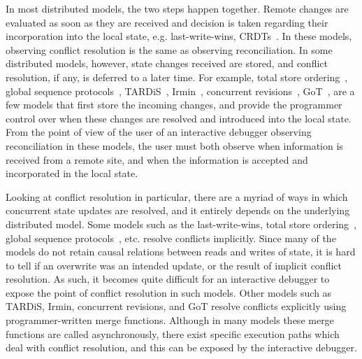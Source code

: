 In most distributed models, the two steps happen together. Remote changes are evaluated as soon as they are received and decision is taken regarding their incorporation into the local state, e.g. last-write-wins, CRDTs~\cite{shapiro11}. In these models, observing conflict resolution is the same as observing reconciliation. In some distributed models, however, state changes received are stored, and conflict resolution, if any, is deferred to a later time. For example, total store ordering~\cite{tso}, global sequence protocols~\cite{gsp, gsp1}, TARDiS~\cite{tardis}, Irmin~\cite{mergeable_types}, concurrent revisions~\cite{semantics-of-concurrent-revisions-2}, GoT~\cite{got}, are a few models that first store the incoming changes, and provide the programmer control over when these changes are resolved and introduced into the local state. From the point of view of the user of an interactive debugger observing reconciliation in these models, the user must both observe when information is received from a remote site, and when the information is accepted and incorporated in the local state.

Looking at conflict resolution in particular, there are a myriad of ways in which concurrent state updates are resolved, and it entirely depends on the underlying distributed model. Some models such as the last-write-wins, total store ordering~\cite{tso}, global sequence protocols~\cite{gsp, gsp1}, etc. resolve conflicts implicitly. Since many of the models do not retain causal relations between reads and writes of state, it is hard to tell if an overwrite was an intended update, or the result of implicit conflict resolution. As such, it becomes quite difficult for an interactive debugger to expose the point of conflict resolution in such models. Other models such as TARDiS, Irmin, concurrent revisions, and GoT resolve conflicts explicitly using programmer-written merge functions. Although in many models these merge functions are called asynchronously, there exist specific execution paths which deal with conflict resolution, and this can be exposed by the interactive debugger.


